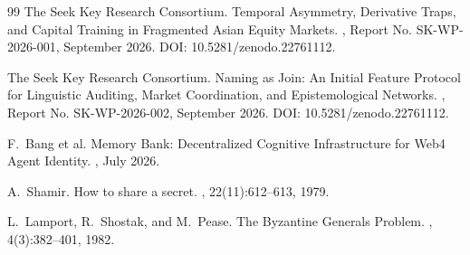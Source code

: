 \documentclass[11pt,a4paper]{article}
\begin{document}

\begin{thebibliography}{99}
The Seek Key Research Consortium.
\newblock Temporal Asymmetry, Derivative Traps, and Capital Training in Fragmented Asian Equity Markets.
, Report No. SK-WP-2026-001, September 2026.
\newblock DOI: 10.5281/zenodo.22761112.

The Seek Key Research Consortium.
\newblock Naming as Join: An Initial Feature Protocol for Linguistic Auditing, Market Coordination, and Epistemological Networks.
, Report No. SK-WP-2026-002, September 2026.
\newblock DOI: 10.5281/zenodo.22761112.

F.~Bang et al.
\newblock Memory Bank: Decentralized Cognitive Infrastructure for Web4 Agent Identity.
, July 2026.

A.~Shamir.
\newblock How to share a secret.
, 22(11):612--613, 1979.

L.~Lamport, R.~Shostak, and M.~Pease.
\newblock The Byzantine Generals Problem.
, 4(3):382--401, 1982.
\end{thebibliography}
\end{document}
